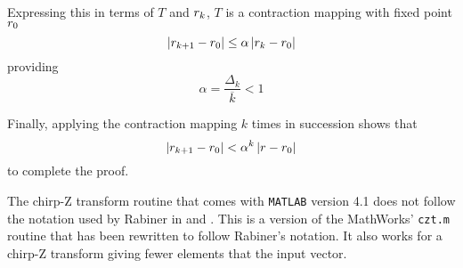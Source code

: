 Expressing this in terms of $T$ and ${r}_k$, $T$ is a contraction mapping 
with fixed point ${r}_0$
\begin{equation}
\left|{r}_{k+1}-{r}_0\right|\leq \alpha\left|{r}_k-{r}_0\right|
\end{equation}
providing
\begin{equation}
\alpha=\frac{\Delta_k}{\overline{k}}<1
\end{equation}

Finally, applying the contraction mapping $k$ times in succession
shows that
\begin{equation}
\left|{r}_{k+1}-{r}_0\right|< \alpha^k \left|{r}-{r}_0\right|
\end{equation}
to complete the proof.

\label{ee app:Matlab CZT}

The chirp-Z transform routine that comes with {\tt MATLAB} version 4.1 does
not follow the notation used by Rabiner in \cite{Rab69b} and \cite{Rab69a}.
This is a version of the MathWorks' {\tt czt.m} routine that has been
rewritten to follow Rabiner's notation.  It also works for a chirp-Z 
transform giving fewer elements that the input vector.

